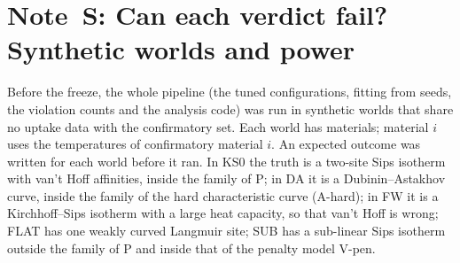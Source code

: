 \documentclass[11pt]{article}
\begin{document}
\begin{landscape}
\begin{table}[h]
\centering
\caption*{Table~S6: The H1 comparisons on the pre-registered data set variants: $R$ with its exact
\% interval and the verdict (P, P better; X, comparator better; eq, equivalent within
\%; inc, inconclusive). The coverage variants are earlier versions of the coverage rule and the
data set without it; the digitization shifts move every digitized isotherm by $\pm\V{perturb}{0.002}$ in $\pss$.}

\end{table}
\end{landscape}

\begin{table}[h]
\centering
\caption*{Table~S7: The H1 comparisons with the percentile bootstrap interval (pre-registered as a
secondary), split into MOFs and COFs (pre-registered subgroup, Hodges--Lehmann estimates only, no intervals at these
sizes), and, as an exploratory check of the dependence between materials from one paper, H1b with the per-material
differences averaged within each source paper (ledger X-4).}

\end{table}
\clearpage

\section*{Note~S: Can each verdict fail? Synthetic worlds and power}

Before the freeze, the whole pipeline (the tuned configurations, fitting from  seeds, the violation
counts and the analysis code) was run in synthetic worlds that share no uptake data with the confirmatory set. Each
world has  materials; material $i$ uses the temperatures of confirmatory material $i$. An expected
outcome was written for each world before it ran. In KS0 the truth is a two-site Sips isotherm with van't Hoff
affinities, inside the family of P; in DA it is a Dubinin--Astakhov curve, inside the family of the hard
characteristic curve (A-hard); in FW it is a Kirchhoff--Sips isotherm with a large heat capacity, so that van't
Hoff is wrong; FLAT has one weakly curved Langmuir site; SUB has a sub-linear Sips isotherm outside the family of P
and inside that of the penalty model V-pen.
\end{document}
